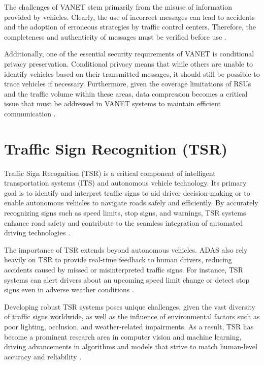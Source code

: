 The challenges of VANET stem primarily from the misuse of information provided by vehicles. Clearly, the use of
 incorrect messages can lead to accidents and the adoption of erroneous strategies by traffic control centers. 
 Therefore, the completeness and authenticity of messages must be verified before use \cite{zEslami}.

Additionally, one of the essential security requirements of VANET is conditional privacy preservation. 
Conditional privacy means that while others are unable to identify vehicles based on their transmitted messages, 
it should still be possible to trace vehicles if necessary. Furthermore, given the coverage 
limitations of RSUs and the traffic volume within these areas, data compression becomes a critical
 issue that must be addressed in VANET systems to maintain efficient communication \cite{zEslami}.

 \section{Traffic Sign Recognition (\ac{TSR})}

 Traffic Sign Recognition (TSR) is a critical component of intelligent transportation systems (ITS) and autonomous 
 vehicle technology. Its primary goal is to identify and interpret traffic signs to aid driver decision-making or to
  enable autonomous vehicles to navigate roads safely and efficiently. By accurately recognizing signs such as speed 
  limits, stop signs, and warnings, TSR systems enhance road safety and contribute to the seamless integration of
   automated driving technologies \cite{Thakur2024}. 

The importance of TSR extends beyond autonomous vehicles. \ac{ADAS} also rely heavily 
on TSR to provide real-time feedback to human drivers, reducing accidents caused by missed or misinterpreted traffic 
signs. For instance, TSR systems can alert drivers about an upcoming speed limit change or detect stop signs even in 
adverse weather conditions \cite{Zhang2022}. 

Developing robust TSR systems poses unique challenges, given the vast diversity of traffic signs worldwide, as well 
as the influence of environmental factors such as poor lighting, occlusion, and weather-related impairments. As a result, 
TSR has become a prominent research area in computer vision and machine learning, driving advancements in algorithms and
 models that strive to match human-level accuracy and reliability \cite{cite-key2}.

